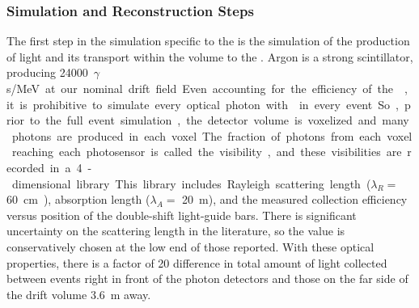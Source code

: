 

\subsubsection{Simulation and Reconstruction Steps} 
\label{subsec:fdsp-pd-simphys-sim}

The first step in the simulation specific to the  is the simulation of the production of light and its transport within the volume to the . Argon is a strong scintillator, producing \SI{24000}{$\gamma$s/MeV} at our nominal drift field. Even accounting for the efficiency of the , it is prohibitive to simulate every optical photon with  in every event. So, prior to the full event simulation, the detector volume is voxelized and many photons are produced in each voxel. The fraction of photons from each voxel reaching each photosensor is called the visibility, and these visibilities are recorded in a 4-dimensional library.
This library includes Rayleigh scattering length ($\lambda_R=$ \SI{60}{cm}~\cite{Grace:2015yta}), absorption length ($\lambda_A=$ \SI{20}{m}), and the measured collection efficiency versus position of the double-shift light-guide bars. There is significant uncertainty on the scattering length in the literature, so the value is conservatively chosen at the low end of those reported. With these optical properties, there is a factor of 20 difference in total amount of light collected between events right in front of the photon detectors and those on the far side of the drift volume \SI{3.6}{m} away. 

